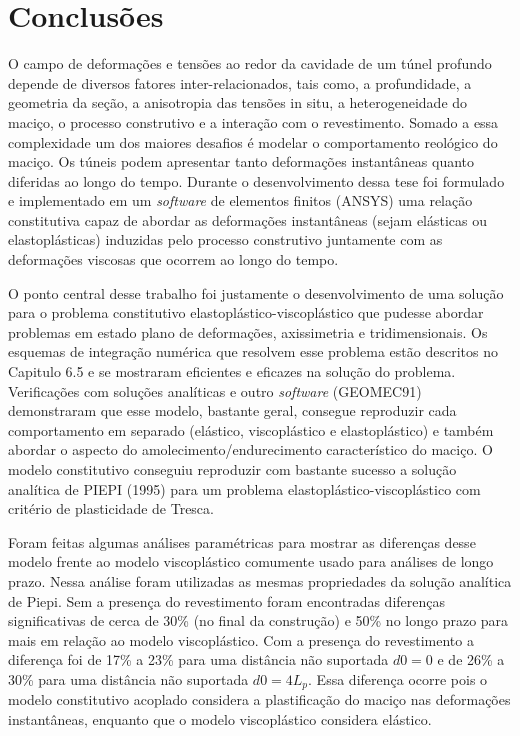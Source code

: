 \chapter{Conclusões}\label{Conclusoes}


O campo de deformações e tensões ao redor da cavidade de um túnel profundo depende de diversos fatores inter-relacionados, tais como, a profundidade, a geometria da seção, a anisotropia das tensões in situ, a heterogeneidade do maciço, o processo construtivo e a interação com o revestimento. Somado a essa complexidade um dos maiores desafios é modelar o comportamento reológico do maciço. Os túneis podem apresentar tanto deformações instantâneas quanto diferidas ao longo do tempo. Durante o desenvolvimento dessa tese foi formulado e implementado em um \textit{software} de elementos finitos (ANSYS) uma relação constitutiva capaz de abordar as deformações instantâneas (sejam elásticas ou elastoplásticas) induzidas pelo processo construtivo juntamente com as deformações viscosas que ocorrem ao longo do tempo.

O ponto central desse trabalho foi justamente o desenvolvimento de uma solução para o problema constitutivo elastoplástico-viscoplástico que pudesse abordar problemas em estado plano de deformações, axissimetria e tridimensionais. Os esquemas de integração numérica que resolvem esse problema estão descritos no Capitulo 6.5 e se mostraram eficientes e eficazes na solução do problema. Verificações com soluções analíticas e outro \textit{software} (GEOMEC91) demonstraram que esse modelo, bastante geral, consegue reproduzir cada comportamento em separado (elástico, viscoplástico e elastoplástico) e também abordar o aspecto do amolecimento/endurecimento característico do maciço. O modelo constitutivo conseguiu reproduzir com bastante sucesso a solução analítica de PIEPI (1995) para um problema elastoplástico-viscoplástico com critério de plasticidade de Tresca.

Foram feitas algumas análises paramétricas para mostrar as diferenças desse modelo frente ao modelo viscoplástico comumente usado para análises de longo prazo. Nessa análise foram utilizadas as mesmas propriedades da solução analítica de Piepi. Sem a presença do revestimento foram encontradas diferenças significativas de cerca de 30\% (no final da construção) e 50\% no longo prazo para mais em relação ao modelo viscoplástico. Com a presença do revestimento a diferença foi de 17\% a 23\% para uma distância não suportada $d0=0$ e de 26\% a 30\% para uma distância não suportada $d0=4L_p$. Essa diferença ocorre pois o modelo constitutivo acoplado considera a plastificação do maciço nas deformações instantâneas, enquanto que o modelo viscoplástico considera elástico.

